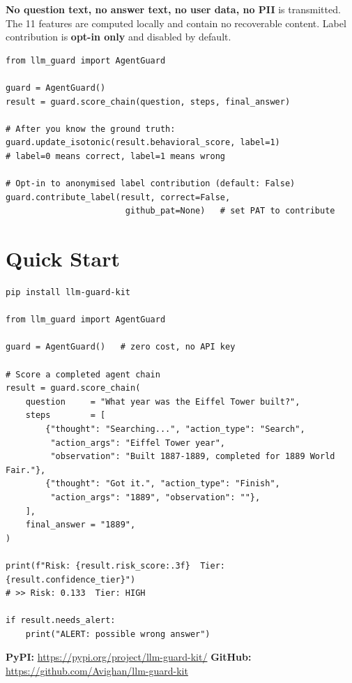 \documentclass[11pt,a4paper]{article}
\begin{document}
\textbf{No question text, no answer text, no user data, no PII} is
transmitted. The 11 features are computed locally and contain no
recoverable content. Label contribution is \textbf{opt-in only} and
disabled by default.

\begin{lstlisting}
from llm_guard import AgentGuard

guard = AgentGuard()
result = guard.score_chain(question, steps, final_answer)

# After you know the ground truth:
guard.update_isotonic(result.behavioral_score, label=1)
# label=0 means correct, label=1 means wrong

# Opt-in to anonymised label contribution (default: False)
guard.contribute_label(result, correct=False,
                        github_pat=None)   # set PAT to contribute
\end{lstlisting}

\section*{Quick Start}

\begin{lstlisting}
pip install llm-guard-kit

from llm_guard import AgentGuard

guard = AgentGuard()   # zero cost, no API key

# Score a completed agent chain
result = guard.score_chain(
    question     = "What year was the Eiffel Tower built?",
    steps        = [
        {"thought": "Searching...", "action_type": "Search",
         "action_args": "Eiffel Tower year",
         "observation": "Built 1887-1889, completed for 1889 World Fair."},
        {"thought": "Got it.", "action_type": "Finish",
         "action_args": "1889", "observation": ""},
    ],
    final_answer = "1889",
)

print(f"Risk: {result.risk_score:.3f}  Tier: {result.confidence_tier}")
# >> Risk: 0.133  Tier: HIGH

if result.needs_alert:
    print("ALERT: possible wrong answer")
\end{lstlisting}

\vspace{1em}

\begin{center}
\small
\textbf{PyPI:} \url{https://pypi.org/project/llm-guard-kit/}
\quad\textbullet\quad
\textbf{GitHub:} \url{https://github.com/Avighan/llm-guard-kit}
\end{center}
\end{document}
